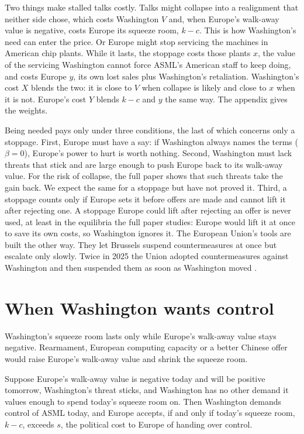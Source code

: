 \documentclass[11pt]{article}
\begin{document}
Two things make stalled talks costly. Talks might collapse into a realignment that neither side chose, which costs Washington $V$ and, when Europe's walk-away value is negative, costs Europe its squeeze room, $k-c$. This is how Washington's need can enter the price. Or Europe might stop servicing the machines in American chip plants. While it lasts, the stoppage costs those plants $x$, the value of the servicing Washington cannot force ASML's American staff to keep doing, and costs Europe $y$, its own lost sales plus Washington's retaliation. Washington's cost $X$ blends the two: it is close to $V$ when collapse is likely and close to $x$ when it is not. Europe's cost $Y$ blends $k-c$ and $y$ the same way. The appendix gives the weights.

Being needed pays only under three conditions, the last of which concerns only a stoppage. First, Europe must have a say: if Washington always names the terms ($\beta=0$), Europe's power to hurt is worth nothing. Second, Washington must lack threats that stick and are large enough to push Europe back to its walk-away value. For the risk of collapse, the full paper shows that such threats take the gain back. We expect the same for a stoppage but have not proved it. Third, a stoppage counts only if Europe sets it before offers are made and cannot lift it after rejecting one. A stoppage Europe could lift after rejecting an offer is never used, at least in the equilibria the full paper studies: Europe would lift it at once to save its own costs, so Washington ignores it. The European Union's tools are built the other way. They let Brussels suspend countermeasures at once but escalate only slowly. Twice in 2025 the Union adopted countermeasures against Washington and then suspended them as soon as Washington moved \citep{commission2025suspension786, commission2025suspension1727}.

\section{When Washington wants control}\label{sec:control-min}

Washington's squeeze room lasts only while Europe's walk-away value stays negative. Rearmament, European computing capacity or a better Chinese offer would raise Europe's walk-away value and shrink the squeeze room.

\begin{proposition}[Control]\label{min:control}
Suppose Europe's walk-away value is negative today and will be positive tomorrow, Washington's threat sticks, and Washington has no other demand it values enough to spend today's squeeze room on. Then Washington demands control of ASML today, and Europe accepts, if and only if today's squeeze room, $k-c$, exceeds $s$, the political cost to Europe of handing over control.
\end{proposition}
\end{document}
